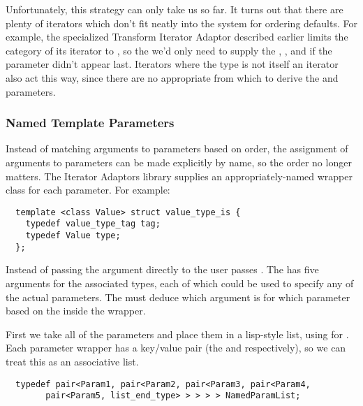 \documentclass{netobjectdays}
\begin{document}
Unfortunately, this strategy can only take us so far. It turns out
that there are plenty of iterators which don't fit neatly into the
system for ordering defaults. For example, the specialized Transform
Iterator Adaptor described earlier
limits the category of its  iterator to
, so the we'd only need to supply the
, , and  if
the  parameter didn't appear last. Iterators where the
 type is not itself an iterator also act this way, since
there are no appropriate  from which to derive
the  and  parameters.

\subsubsection{Named Template Parameters}
\label{sec:named-template-parameters}

Instead of matching arguments to parameters based on order, the
assignment of arguments to parameters can be made explicitly by name, so
the order no longer matters. The Iterator Adaptors library supplies
an appropriately-named wrapper class for each parameter. For example:

{\footnotesize
\begin{verbatim} 
  template <class Value> struct value_type_is {
    typedef value_type_tag tag;
    typedef Value type;
  };
\end{verbatim} 
}

Instead of passing the argument  directly to
 the user passes
. The  has
five arguments for the associated types, each of which could be used
to specify any of the actual parameters. The
 must deduce which argument is for which
parameter based on the  inside the wrapper.

First we take all of the parameters and place them in a
lisp-style list, using  for . Each
parameter wrapper has a key/value pair (the  and 
respectively), so we can treat this as an associative list.

{\footnotesize
\begin{verbatim} 
  typedef pair<Param1, pair<Param2, pair<Param3, pair<Param4,
	    pair<Param5, list_end_type> > > > > NamedParamList;
\end{verbatim} 
}
\end{document}

